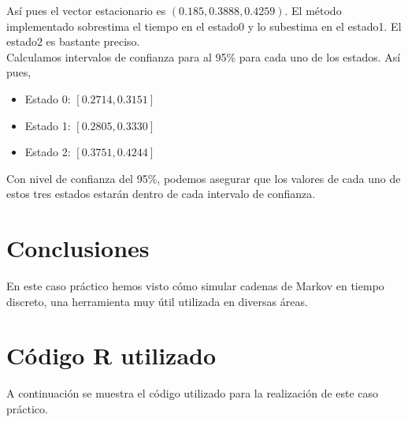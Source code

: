 \documentclass[12pt,a4paper,twoside,openright,titlepage,final]{article}
\begin{document}
Así pues el vector estacionario es $(0.185, 0.3888, 0.4259)$. El método implementado sobrestima el tiempo en el estado0 y lo subestima en el estado1. El estado2 es bastante preciso.\\

Calculamos intervalos de confianza para al 95\% para cada uno de los estados. Así pues,

\begin{itemize}
	\item Estado 0: $[0.2714, 0.3151]$
	\item Estado 1: $[0.2805, 0.3330]$
	\item Estado 2: $[0.3751, 0.4244]$
\end{itemize}

Con nivel de confianza del 95\%, podemos asegurar que los valores de cada uno de estos tres estados estarán dentro de cada intervalo de confianza.


\section{Conclusiones}

En este caso práctico hemos visto cómo simular cadenas de Markov en tiempo discreto, una herramienta muy útil utilizada en diversas áreas.

\newpage

\appendix
\section{Código R utilizado}\label{app:codigo}

A continuación se muestra el código utilizado para la realización de este caso práctico.

\inputminted{r}{../codigo/caso_iii.R}
\end{document}
